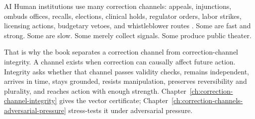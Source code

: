 \begin{refsection}
\begin{authbar}{AI}
Human institutions use many correction channels: appeals, injunctions, ombuds offices, recalls, elections, clinical holds, regulator orders, labor strikes, licensing actions, budgetary vetoes, and whistleblower routes \autocite{near1985whistleblowing,doj2017consent}.
Some are fast and strong.
Some are slow.
Some merely collect signals.
Some produce public theater.

That is why the book separates a correction channel from correction-channel integrity.
A channel exists when correction can causally affect future action.
Integrity asks whether that channel passes validity checks, remains independent, arrives in time, stays grounded, resists manipulation, preserves reversibility and plurality, and reaches action with enough strength.
Chapter~\ref{ch:correction-channel-integrity} gives the vector certificate; Chapter~\ref{ch:correction-channels-adversarial-pressure} stress-tests it under adversarial pressure.


\end{authbar}
\end{refsection}
